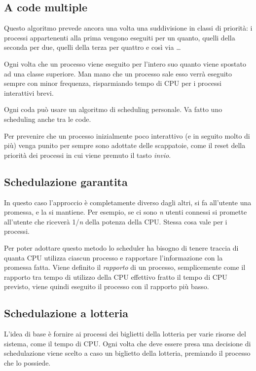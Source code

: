 \subsection{A code multiple}

Questo algoritmo prevede ancora una volta una suddivisione in classi di priorità: i processi appartenenti alla prima vengono eseguiti per un quanto, quelli della seconda per due, quelli della terza per quattro e così via \dots

Ogni volta che un processo viene eseguito per l'intero suo quanto viene spostato ad una classe superiore.
Man mano che un processo sale esso verrà eseguito sempre con minor frequenza, risparmiando tempo di CPU per i processi interattivi brevi.

Ogni coda può usare un algoritmo di scheduling personale. Va fatto uno scheduling anche tra le code.

Per prevenire che un processo inizialmente poco interattivo (e in seguito molto di più) venga punito per sempre sono adottate delle scappatoie, come il reset della priorità dei processi in cui viene premuto il tasto \textit{invio}.

\subsection{Schedulazione garantita}

In questo caso l'approccio è completamente diverso dagli altri, si fa all'utente una promessa, e la si mantiene. Per esempio, se ci sono \textit{n} utenti connessi si promette all'utente che riceverà 1/\textit{n} della potenza della CPU. Stessa cosa vale per i processi.

Per poter adottare questo metodo lo scheduler ha bisogno di tenere traccia di quanta CPU utilizza ciascun processo e rapportare l'informazione con la promessa fatta. Viene definito il \textit{rapporto} di un processo, semplicemente come il rapporto tra tempo di utilizzo della CPU effettivo fratto il tempo di CPU previsto, viene quindi eseguito il processo con il rapporto più basso.

\subsection{Schedulazione a lotteria}

L'idea di base è fornire ai processi dei biglietti della lotteria per varie risorse del sistema, come il tempo di CPU. Ogni volta che deve essere presa una decisione di schedulazione viene scelto a caso un biglietto della lotteria, premiando il processo che lo possiede.

